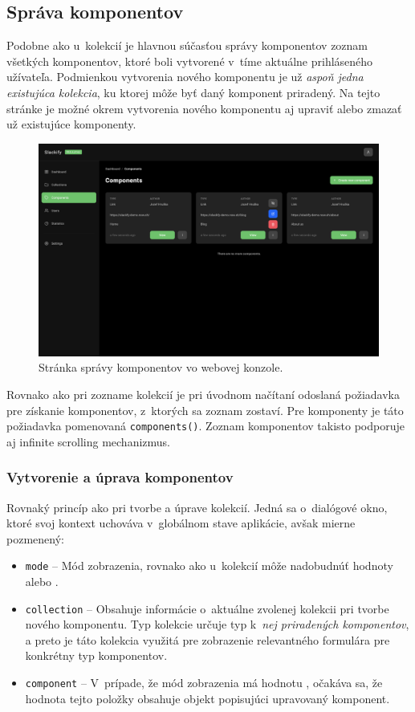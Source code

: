 \subsection{Správa komponentov}
Podobne ako u~kolekcií je hlavnou súčasťou správy komponentov zoznam všetkých komponentov, ktoré boli vytvorené v~tíme aktuálne prihláseného užívateľa. Podmienkou vytvorenia nového komponentu je už \emph{aspoň jedna existujúca kolekcia}, ku ktorej môže byť daný komponent priradený. Na tejto stránke je možné okrem vytvorenia nového komponentu aj upraviť alebo zmazať už existujúce komponenty.

\begin{figure}[H]
	\centering
	\includegraphics[scale=0.085]{obrazky-figures/screenshot_components}
	\caption{Stránka správy komponentov vo webovej konzole.}
\end{figure}

\noindent Rovnako ako pri zozname kolekcií je pri úvodnom načítaní odoslaná požiadavka pre získanie komponentov, z~ktorých sa zoznam zostaví. Pre komponenty je táto požiadavka pomenovaná \texttt{components()}. Zoznam komponentov takisto podporuje aj infinite scrolling mechanizmus.

\subsubsection{Vytvorenie a úprava komponentov}
Rovnaký princíp ako pri tvorbe a úprave kolekcií. Jedná sa o~dialógové okno, ktoré svoj kontext uchováva v~globálnom stave aplikácie, avšak mierne pozmenený:

\begin{itemize}
	\item \texttt{mode} -- Mód zobrazenia, rovnako ako u~kolekcií môže nadobudnúť hodnoty  alebo .
	\item \texttt{collection} -- Obsahuje informácie o~aktuálne zvolenej kolekcii pri tvorbe nového komponentu. Typ kolekcie určuje typ k~\emph{nej priradených komponentov}, a preto je táto kolekcia využitá pre zobrazenie relevantného formulára pre konkrétny typ komponentov.
	\item \texttt{component} -- V~prípade, že mód zobrazenia má hodnotu , očakáva sa, že hodnota tejto položky obsahuje objekt popisujúci upravovaný komponent.
\end{itemize}

